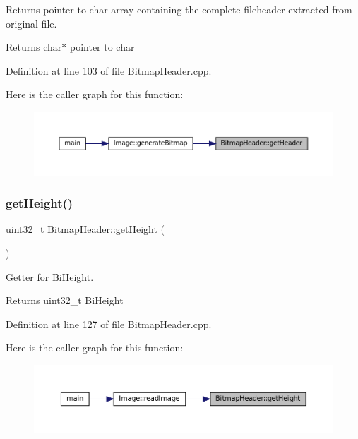 Returns pointer to char array containing the complete fileheader extracted from original file. 

\begin{DoxyReturn}{Returns}
char$\ast$ pointer to char 
\end{DoxyReturn}


Definition at line 103 of file Bitmap\+Header.\+cpp.

Here is the caller graph for this function\+:
\nopagebreak
\begin{figure}[H]
\begin{center}
\leavevmode
\includegraphics[width=350pt]{classBitmapHeader_aa29e1acc8a7a588867039d7c0bdcde04_icgraph}
\end{center}
\end{figure}
\mbox{\label{classBitmapHeader_a106f72d6c256327342029edf8e18bde1}} 
\subsubsection{\texorpdfstring{getHeight()}{getHeight()}}
{\footnotesize\ttfamily uint32\+\_\+t Bitmap\+Header\+::get\+Height (\begin{DoxyParamCaption}{ }\end{DoxyParamCaption})}



Getter for Bi\+Height. 

\begin{DoxyReturn}{Returns}
uint32\+\_\+t Bi\+Height 
\end{DoxyReturn}


Definition at line 127 of file Bitmap\+Header.\+cpp.

Here is the caller graph for this function\+:
\nopagebreak
\begin{figure}[H]
\begin{center}
\leavevmode
\includegraphics[width=350pt]{classBitmapHeader_a106f72d6c256327342029edf8e18bde1_icgraph}
\end{center}
\end{figure}
\mbox{\label{classBitmapHeader_a70702e4d8aba2a3502f776f73bfecde8}} 
